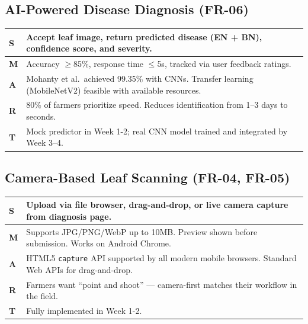 \documentclass[12pt,a4paper]{article}
\begin{document}
\renewcommand{\arraystretch}{1.3}

\subsection{AI-Powered Disease Diagnosis (FR-06)}
\begin{tabularx}{\textwidth}{|l|X|}
\hline
\rowcolor{lightgreen}
\textbf{S} & Accept leaf image, return predicted disease (EN + BN), confidence score, and severity. \\
\hline
\textbf{M} & Accuracy $\geq$85\%, response time $\leq$5s, tracked via user feedback ratings. \\
\hline
\textbf{A} & Mohanty et al.\ achieved 99.35\% with CNNs. Transfer learning (MobileNetV2) feasible with available resources. \\
\hline
\textbf{R} & 80\% of farmers prioritize speed. Reduces identification from 1--3 days to seconds. \\
\hline
\textbf{T} & Mock predictor in Week 1-2; real CNN model trained and integrated by Week 3--4. \\
\hline
\end{tabularx}

\subsection{Camera-Based Leaf Scanning (FR-04, FR-05)}
\begin{tabularx}{\textwidth}{|l|X|}
\hline
\rowcolor{lightgreen}
\textbf{S} & Upload via file browser, drag-and-drop, or live camera capture from diagnosis page. \\
\hline
\textbf{M} & Supports JPG/PNG/WebP up to 10MB. Preview shown before submission. Works on Android Chrome. \\
\hline
\textbf{A} & HTML5 \texttt{capture} API supported by all modern mobile browsers. Standard Web APIs for drag-and-drop. \\
\hline
\textbf{R} & Farmers want ``point and shoot'' --- camera-first matches their workflow in the field. \\
\hline
\textbf{T} & Fully implemented in Week 1-2. \\
\hline
\end{tabularx}
\end{document}
